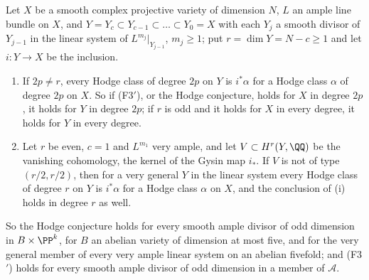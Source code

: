 \begin{proposition}
\label{prop:f3primeample}
Let $X$ be a smooth complex projective variety of dimension $N$, $L$ an
ample line bundle on $X$, and $Y=Y_{c}\subset Y_{c-1}\subset\dots\subset
Y_{0}=X$ with each $Y_{j}$ a smooth divisor of $Y_{j-1}$ in the linear
system of $L^{m_{j}}|_{Y_{j-1}}$, $m_{j}\ge1$; put $r=\dim Y=N-c\ge1$ and
let $i\colon Y\to X$ be the inclusion.
\begin{enumerate}[label=\textup{(\roman*)},leftmargin=2.6em,itemsep=2pt]
\item If $2p\ne r$, every Hodge class of degree $2p$ on $Y$ is $i^{*}\alpha$
  for a Hodge class $\alpha$ of degree $2p$ on $X$. So if \textup{(F3$'$)}, or
  the Hodge conjecture, holds for $X$ in degree $2p$, it holds for $Y$ in
  degree $2p$; if $r$ is odd and it holds for $X$ in every degree, it holds
  for $Y$ in every degree.
\item Let $r$ be even, $c=1$ and $L^{m_{1}}$ very ample, and let
  $V\subset H^{r}(Y,\QQ)$ be the vanishing cohomology, the kernel of the
  Gysin map $i_{*}$. If $V$ is not of type $(r/2,r/2)$, then for a very
  general $Y$ in the linear system every Hodge class of degree $r$ on $Y$ is
  $i^{*}\alpha$ for a Hodge class $\alpha$ on $X$, and the conclusion of (i)
  holds in degree $r$ as well.
\end{enumerate}
So the Hodge conjecture holds for every smooth ample divisor of odd dimension
in $B\times\PP^{k}$, for $B$ an abelian variety of dimension at most five, and
for the very general member of every very ample linear system on an abelian
fivefold; and \textup{(F3$'$)} holds for every smooth ample divisor of odd
dimension in a member of $\mathcal{A}$.
\end{proposition}

